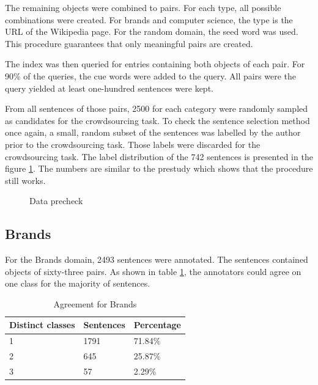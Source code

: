 The remaining objects were combined to pairs. For each type, all possible combinations were created. For brands and computer science, the type is the URL of the Wikipedia page. For the random domain, the seed word was used. This procedure guarantees that only meaningful pairs are created.




The index was then queried for entries containing both objects of each pair. For 90\% of the queries, the cue words were added to the query. All pairs were the query yielded at least one-hundred sentences were kept.

From all sentences of those pairs, 2500 for each category were randomly sampled as candidates for the crowdsourcing task. To check the sentence selection method once again, a small, random subset of the sentences was labelled by the author prior to the crowdsourcing task. Those labels were discarded for the crowdsourcing task.
The label distribution of the 742 sentences is presented in the figure \ref{fig:sample}. The numbers are similar to the prestudy which shows that the procedure still works.


\begin{figure}[h]
\centering
\caption{Data precheck}
\label{fig:sample}
\end{figure}

\subsection{Brands}
\label{sec:brands}
For the Brands domain, 2493 sentences were annotated. The sentences contained objects of sixty-three pairs. As shown in table \ref{fig:brand_agg}, the annotators could agree on one class for the majority of sentences.

\begin{table}[h]
\caption{Agreement for Brands}
\label{fig:brand_agg}
\begin{tabularx}{\textwidth}{XXX}
\toprule
Distinct classes & Sentences & Percentage \\
\midrule
1 & 1791 & 71.84\%\\
2 & 645 & 25.87\%\\
3 & 57 & 2.29\%\\
\bottomrule
\end{tabularx}
\end{table}



